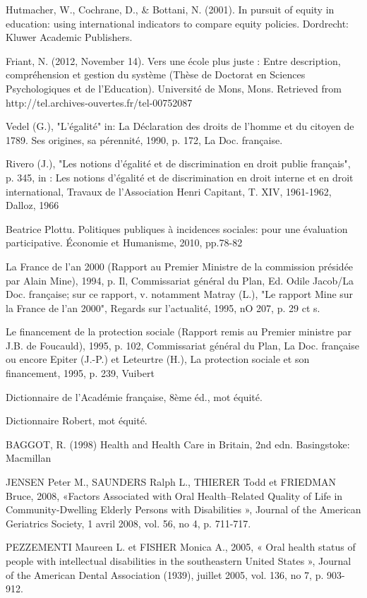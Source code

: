 Hutmacher, W., Cochrane, D., & Bottani, N. (2001). In pursuit of equity in education: using international indicators to compare equity policies. Dordrecht: Kluwer Academic Publishers.

Friant, N. (2012, November 14). Vers une école plus juste : Entre description, compréhension et gestion du système (Thèse de Doctorat en Sciences Psychologiques et de l’Education). Université de Mons, Mons. Retrieved from http://tel.archives-ouvertes.fr/tel-00752087 

Vedel (G.), "L'égalité" in: La Déclaration des droits de l'homme et du citoyen de 1789. Ses origines, sa pérennité, 1990, p. 172, La Doc. française.

Rivero (J.), "Les notions d'égalité et de discrimination en droit publie français", p. 345, in : Les notions d'égalité et de discrimination en droit interne et en droit international, Travaux de l'Association Henri Capitant, T. XIV, 1961-1962, Dalloz, 1966

Beatrice Plottu. Politiques publiques à incidences sociales: pour une évaluation participative. Économie et Humanisme, 2010, pp.78-82



La France de l'an 2000 (Rapport au Premier Ministre de la commission présidée par Alain Mine), 1994, p. Il, Commissariat général du Plan, Ed. Odile Jacob/La Doc. française; sur ce rapport, v. notamment Matray (L.), "Le rapport Mine sur la France de l'an 2000", Regards sur l'actualité, 1995, nO 207, p. 29 ct s.


Le financement de la protection sociale (Rapport remis au Premier ministre par J.B. de Foucauld), 1995, p. 102, Commissariat général du Plan, La Doc. française ou encore Epiter (J.-P.) et Leteurtre (H.), La protection sociale et son financement, 1995, p. 239, Vuibert


Dictionnaire de l'Académie française, 8ème éd., mot équité.

Dictionnaire Robert, mot équité.

 BAGGOT, R. (1998) Health and Health Care in Britain, 2nd edn. Basingstoke: Macmillan
 

JENSEN Peter M., SAUNDERS Ralph L., THIERER Todd et FRIEDMAN Bruce, 2008, «Factors Associated with Oral Health–Related Quality of Life in Community-Dwelling Elderly Persons with Disabilities », Journal of the American Geriatrics Society, 1 avril 2008, vol. 56, no 4, p. 711-717.


PEZZEMENTI Maureen L. et FISHER Monica A., 2005, « Oral health status of people with intellectual disabilities in the southeastern United States », Journal of the American Dental Association (1939), juillet 2005, vol. 136, no 7, p. 903-912.


